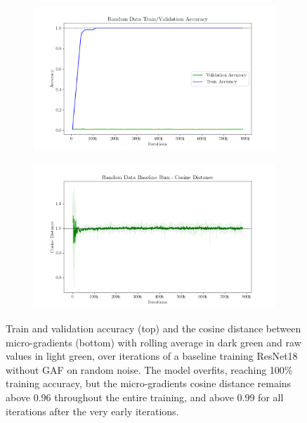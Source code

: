 \begin{figure}[th]
    \centering
    \begin{subfigure}{0.975\linewidth}
        \centering
        \includegraphics[width=\linewidth,  trim=0 0 0 17mm, clip]{figures/figure_3_1_random_data_run.png}
    \end{subfigure}
    \hfill
    \begin{subfigure}{0.975\linewidth}
        \centering
        \includegraphics[width=\linewidth,  trim=0 0 0 17mm, clip]{figures/figure_3_2_Random_Data_Run_Cosine_Distance.png}
    \end{subfigure}
   
    \caption{Train and validation accuracy (top) and the cosine distance between micro-gradients (bottom) with rolling average in dark green and raw values in light green, over iterations of a baseline training ResNet18 without GAF on random noise. The model overfits, reaching 100\% training accuracy, but the micro-gradients cosine distance remains above 0.96 throughout the entire training, and above 0.99 for all iterations after the very early iterations. }
    \label{fig:random_data_run}
\end{figure}



